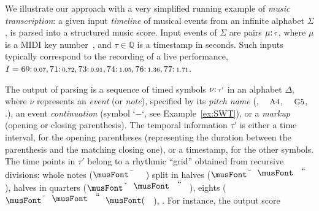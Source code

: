         
\begin{example}%
\label{ex:running}
We illustrate our approach with a very simplified %
running example of \emph{music transcription}:
a given input \emph{timeline} of musical events
from an infinite alphabet $\Sigma$,
is parsed into a structured music score.
Input events of $\Sigma$
are pairs $\mu \mathpunct{:}{\scriptstyle \tau}$, where $\mu$ is a
MIDI key number~\cite{Selfridge-Field97beyondMIDI}, %
and $\tau \in \mathbb{Q}$ is a timestamp in seconds.
Such inputs typically correspond
to the recording of a live performance, 
\eg~$I = 69\mathpunct{:}{\scriptstyle 0.07},
	     71\mathpunct{:}{\scriptstyle 0.72},
    	 73\mathpunct{:}{\scriptstyle 0.91},
	     74\mathpunct{:}{\scriptstyle 1.05},
	     76\mathpunct{:}{\scriptstyle 1.36},
	     77\mathpunct{:}{\scriptstyle 1.71}$. %

The output of parsing is a sequence of
timed symbols $\nu\mathpunct{:}{\scriptstyle \tau'}$ in an alphabet $\Delta$,
where $\nu$  represents
an \emph{event} (or \emph{note}),
specified by its \emph{pitch name}
(\eg, $\mbox{\footnotesize A4}$, $\mbox{\footnotesize G5}$, \etc.),
an event \emph{continuation} (symbol `$-$`, see Example~\ref{ex:SWT}),
or a \emph{markup} (opening or closing parenthesis). %
The temporal information $\tau'$ 
is either a time interval, for the opening parentheses
(representing the duration between the parenthesis 
 and the matching closing one), 
or a timestamp, for the other symbols.
The time points in $\tau'$ belong to a rhythmic ``grid'' obtained from recursive divisions:
whole notes ($\musWhole$) split in halves ($\musHalf$), halves
in quarters ($\musQuarter$), eights ($\musEighth$), \etc.
%
For instance, the output score

\end{example}
